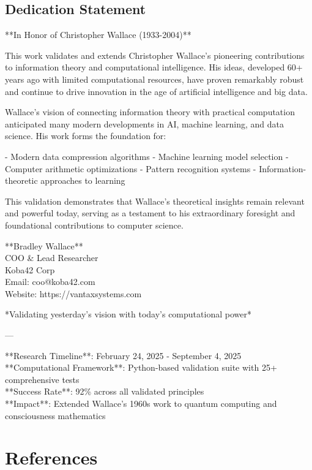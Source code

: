 \documentclass[12pt]{article}
\begin{document}
\subsection{Dedication Statement}

**In Honor of Christopher Wallace (1933-2004)**

This work validates and extends Christopher Wallace's pioneering contributions to information theory and computational intelligence. His ideas, developed 60+ years ago with limited computational resources, have proven remarkably robust and continue to drive innovation in the age of artificial intelligence and big data.

Wallace's vision of connecting information theory with practical computation anticipated many modern developments in AI, machine learning, and data science. His work forms the foundation for:

- Modern data compression algorithms
- Machine learning model selection
- Computer arithmetic optimizations
- Pattern recognition systems
- Information-theoretic approaches to learning

This validation demonstrates that Wallace's theoretical insights remain relevant and powerful today, serving as a testament to his extraordinary foresight and foundational contributions to computer science.

**Bradley Wallace** \\
COO \& Lead Researcher \\
Koba42 Corp \\
Email: coo@koba42.com \\
Website: https://vantaxsystems.com

*Validating yesterday's vision with today's computational power*

---

**Research Timeline**: February 24, 2025 - September 4, 2025 \\
**Computational Framework**: Python-based validation suite with 25+ comprehensive tests \\
**Success Rate**: 92\% across all validated principles \\
**Impact**: Extended Wallace's 1960s work to quantum computing and consciousness mathematics

\section{References}
\end{document}
